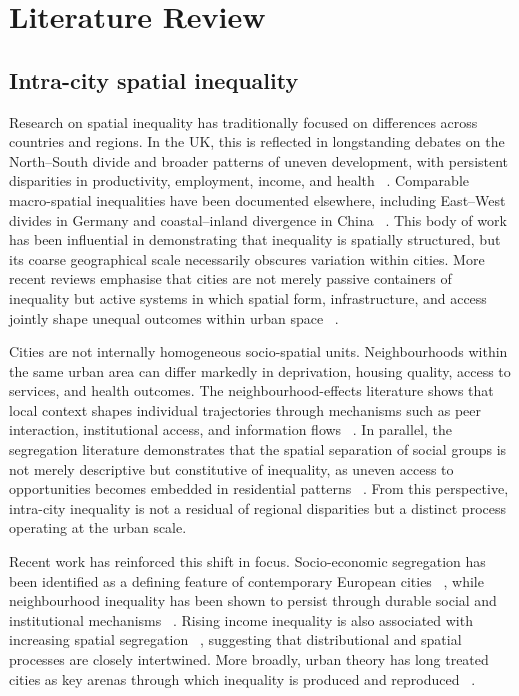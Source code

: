 \documentclass[11pt,journal,compsoc]{IEEEtran}
\begin{document}
\section{Literature Review}
\subsection{Intra-city spatial inequality}

Research on spatial inequality has traditionally focused on differences across countries and regions. In the UK, this is reflected in longstanding debates on the North--South divide and broader patterns of uneven development, with persistent disparities in productivity, employment, income, and health ~\cite{martin2016spatially,bambra2014north,mccann2016uk}. Comparable macro-spatial inequalities have been documented elsewhere, including East--West divides in Germany and coastal--inland divergence in China ~\cite{iammarino2019regional,wei2009beyond}. This body of work has been influential in demonstrating that inequality is spatially structured, but its coarse geographical scale necessarily obscures variation within cities. More recent reviews emphasise that cities are not merely passive containers of inequality but active systems in which spatial form, infrastructure, and access jointly shape unequal outcomes within urban space ~\cite{sarkar2024spatial}.

Cities are not internally homogeneous socio-spatial units. Neighbourhoods within the same urban area can differ markedly in deprivation, housing quality, access to services, and health outcomes. The neighbourhood-effects literature shows that local context shapes individual trajectories through mechanisms such as peer interaction, institutional access, and information flows ~\cite{ellen1997does,galster2011mechanism,tammaru2014socio}. In parallel, the segregation literature demonstrates that the spatial separation of social groups is not merely descriptive but constitutive of inequality, as uneven access to opportunities becomes embedded in residential patterns ~\cite{massey1988dimensions,tammaru2014socio}. From this perspective, intra-city inequality is not a residual of regional disparities but a distinct process operating at the urban scale.

Recent work has reinforced this shift in focus. Socio-economic segregation has been identified as a defining feature of contemporary European cities ~\cite{tammaru2014socio}, while neighbourhood inequality has been shown to persist through durable social and institutional mechanisms ~\cite{sampson2012great}. Rising income inequality is also associated with increasing spatial segregation ~\cite{reardon2011income}, suggesting that distributional and spatial processes are closely intertwined. More broadly, urban theory has long treated cities as key arenas through which inequality is produced and reproduced ~\cite{massey1974social,fainstein2014just,soja2013seeking,florida2017new}.
\end{document}
